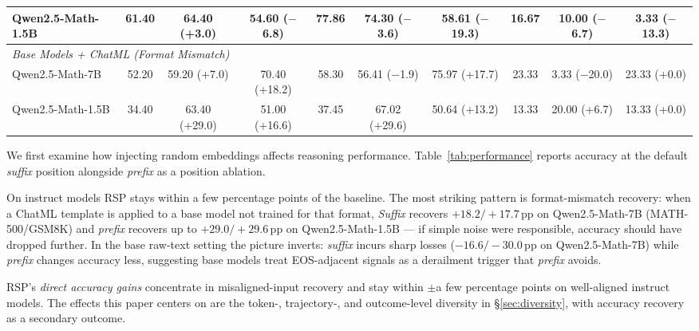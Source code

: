 \begin{table}[!t]
{\begin{tabular}{l ccc ccc ccc}
Qwen2.5-Math-1.5B      & 61.40 & \cellcolor{blue!10}64.40 {\scriptsize(+3.0)}    & \cellcolor{blue!10}54.60 {\scriptsize($-$6.8)}  & 77.86 & \cellcolor{blue!10}74.30 {\scriptsize($-$3.6)}  & \cellcolor{blue!10}58.61 {\scriptsize($-$19.3)} & 16.67 & \cellcolor{blue!10}10.00 {\scriptsize($-$6.7)}  & \cellcolor{blue!10}3.33  {\scriptsize($-$13.3)} \\
\midrule
\multicolumn{10}{l}{\textit{Base Models + ChatML (Format Mismatch)}} \\
\midrule
Qwen2.5-Math-7B        & 52.20 & \cellcolor{blue!10}59.20 {\scriptsize(+7.0)}    & \cellcolor{blue!10}70.40 {\scriptsize(+18.2)}   & 58.30 & \cellcolor{blue!10}56.41 {\scriptsize($-$1.9)}  & \cellcolor{blue!10}75.97 {\scriptsize(+17.7)} & 23.33 & \cellcolor{blue!10}3.33  {\scriptsize($-$20.0)} & \cellcolor{blue!10}23.33 {\scriptsize(+0.0)}  \\
Qwen2.5-Math-1.5B      & 34.40 & \cellcolor{blue!10}63.40 {\scriptsize(+29.0)}   & \cellcolor{blue!10}51.00 {\scriptsize(+16.6)}   & 37.45 & \cellcolor{blue!10}67.02 {\scriptsize(+29.6)}   & \cellcolor{blue!10}50.64 {\scriptsize(+13.2)} & 13.33 & \cellcolor{blue!10}20.00 {\scriptsize(+6.7)}    & \cellcolor{blue!10}13.33 {\scriptsize(+0.0)}  \\
\bottomrule
\end{tabular}}
\end{table}

We first examine how injecting random embeddings affects reasoning performance. Table~\ref{tab:performance} reports accuracy at the default \emph{suffix} position alongside \emph{prefix} as a position ablation.

On instruct models RSP stays within a few percentage points of the baseline. The most striking pattern is format-mismatch recovery: when a ChatML template is applied to a base model not trained for that format, \emph{Suffix} recovers $+18.2/+17.7$\,pp on Qwen2.5-Math-7B (MATH-500/GSM8K) and \emph{prefix} recovers up to $+29.0/+29.6$\,pp on Qwen2.5-Math-1.5B --- if simple noise were responsible, accuracy should have dropped further. In the base raw-text setting the picture inverts: \emph{suffix} incurs sharp losses ($-16.6/-30.0$\,pp on Qwen2.5-Math-7B) while \emph{prefix} changes accuracy less, suggesting base models treat EOS-adjacent signals as a derailment trigger that \emph{prefix} avoids.

RSP's \emph{direct accuracy gains} concentrate in misaligned-input recovery and stay within $\pm$a few percentage points on well-aligned instruct models. The effects this paper centers on are the token-, trajectory-, and outcome-level diversity in \S\ref{sec:diversity}, with accuracy recovery as a secondary outcome.

